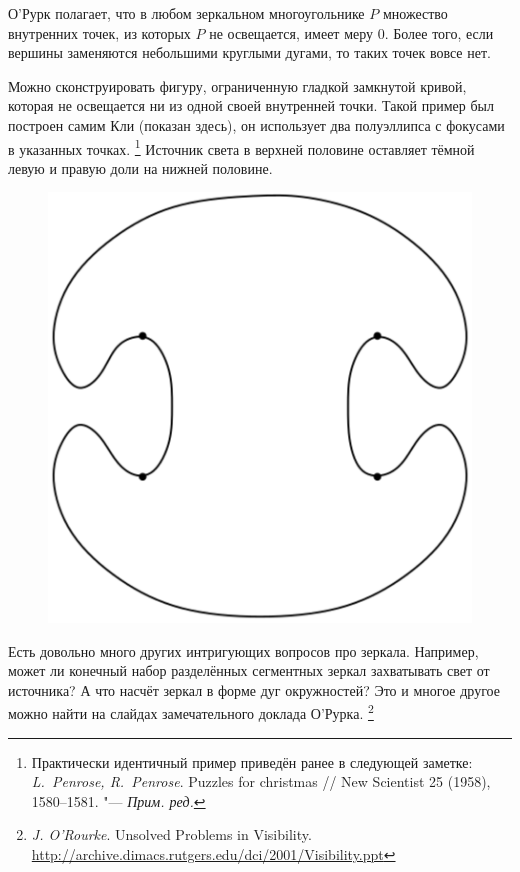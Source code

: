 \documentclass[twoside]{book}
\begin{document}
О’Рурк полагает, что в любом зеркальном многоугольнике $P$ множество внутренних точек, из которых $P$ не освещается, имеет меру 0.
Более того, если вершины заменяются небольшими круглыми дугами, то таких точек вовсе нет.


Можно сконструировать фигуру, ограниченную гладкой замкнутой кривой, которая не освещается ни из одной своей внутренней точки. 
Такой пример был построен самим Кли (показан здесь), он использует два полуэллипса с фокусами в указанных точках.%
\footnote{Практически идентичный пример приведён ранее в следующей заметке: \emph{L.~Penrose, R.~Penrose}. Puzzles for christmas /\!/ {New Scientist} 25 (1958), 1580--1581. "--- \emph{Прим. ред.}}
Источник света в верхней половине оставляет тёмной левую и правую доли на нижней половине.


\begin{figure}[!ht]
\centering
\includegraphics[scale=0.5]{Figs/UnsolvedPuzzles/klee}
\end{figure} 

Есть довольно много других интригующих вопросов про зеркала.
Например, может ли конечный набор разделённых сегментных зеркал захватывать свет от источника?
А что насчёт зеркал в форме дуг окружностей?
Это и многое другое можно найти на слайдах замечательного доклада О’Рурка.%
\footnote{\emph{J. O'Rourke}. Unsolved Problems in Visibility. \url{http://archive.dimacs.rutgers.edu/dci/2001/Visibility.ppt}}
\end{document}
